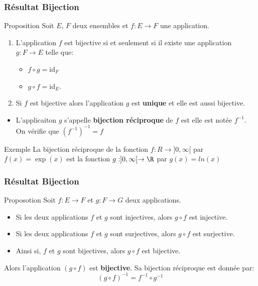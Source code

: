 \begin{frame}[t]
  \frametitle{Résultat Bijection}
  \normalsize
  \begin{block}{Proposition}
    Soit $E$, $F$ deux ensembles et $f: E\rightarrow F$ une application.

    \begin{enumerate}
      \item L'application $f$ est bijective si et seulement si il existe une
        application $g:F\rightarrow E$ telle que:
        \begin{itemize}
          \item $f\circ g=\text{id}_F$ 
          \item  $g\circ f = \text{id}_E$.
        \end{itemize}
      \item Si $f$ est bijective alors l'application $g$ est
        \textbf{\alert{unique}}  et elle est aussi bijective.
    \end{enumerate}
 \end{block}  

 \begin{itemize}
   \item L'applicaiton $g$ s'appelle \textbf{\alert{bijection réciproque}} de
     $f$ est elle est notée $f^{-1}$. On vérifie que $(f^{-1})^{-1}= f$
 \end{itemize}
 \begin{block}{Exemple}
   La bijection réciproque de la fonction 
   $f:R\rightarrow ]0,\infty[$ par $f(x)= \exp(x)$
  est la fonction $g: ]0,\infty[ \rightarrow \R$ par $g(x)=ln(x)$
 \end{block}
\end{frame}

\begin{frame}[t]
  \frametitle{Résultat Bijection}

  \begin{block}{Proposotion}
 Soit $f: E\rightarrow F$ et $ g:F\rightarrow G$ deux applications.
 \begin{itemize}
   \item Si les deux applications $f$ et $g$ sont injectives, alors $g\circ f$
     est injective.   

   \item Si les deux applications $f$ et $g$ sont surjectives, alors $g\circ f$
     est surjective.   
   \item  Ainsi si, $f$ et $g$ sont bijectives, alors $g\circ f$ est bijective.
 \end{itemize}

  \end{block}


 Alors l'application $(g\circ f)$ est \textbf{\alert{bijective}}. Sa bijection
 réciproque est donnée par:
 \begin{equation}
   \left(g\circ f\right)^{-1} = f^{-1}\circ g^{-1}
 \end{equation}
\end{frame}

